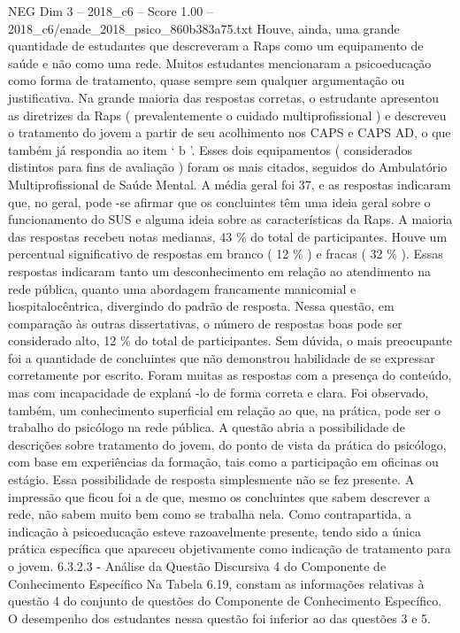 \begin{textsample}{NEG Dim 3 – 2018\_c6 – Score 1.00 – 2018\_c6/enade\_2018\_psico\_860b383a75.txt}
Houve, ainda, uma grande quantidade de estudantes que descreveram a Raps como um equipamento de saúde e não como uma rede.
Muitos estudantes mencionaram a psicoeducação como forma de tratamento, quase sempre sem qualquer argumentação ou justificativa.
Na grande maioria das respostas corretas, o estrudante apresentou as diretrizes da Raps ( prevalentemente o cuidado multiprofissional ) e descreveu o tratamento do jovem a partir de seu acolhimento nos CAPS e CAPS AD, o que também já respondia ao item ‘ b ’.
Esses dois equipamentos ( considerados distintos para fins de avaliação ) foram os mais citados, seguidos do Ambulatório Multiprofissional de Saúde Mental.
A média geral foi 37, e as respostas indicaram que, no geral, pode -se afirmar que os concluintes têm uma ideia geral sobre o funcionamento do SUS e alguma ideia sobre as características da Raps.
A maioria das respostas recebeu notas medianas, 43 \% do total de participantes.
Houve um percentual significativo de respostas em branco ( 12 \% ) e fracas ( 32 \% ).
Essas respostas indicaram tanto um desconhecimento em relação ao atendimento na rede pública, quanto uma abordagem francamente manicomial e hospitalocêntrica, divergindo do padrão de resposta.
Nessa questão, em comparação às outras dissertativas, o número de respostas boas pode ser considerado alto, 12 \% do total de participantes.
Sem dúvida, o mais preocupante foi a quantidade de concluintes que não demonstrou habilidade de se expressar corretamente por escrito.
Foram muitas as respostas com a presença do conteúdo, mas com incapacidade de explaná -lo de forma correta e clara.
Foi observado, também, um conhecimento superficial em relação ao que, na prática, pode ser o trabalho do psicólogo na rede pública.
A questão abria a possibilidade de descrições sobre tratamento do jovem, do ponto de vista da prática do psicólogo, com base em experiências da formação, tais como a participação em oficinas ou estágio.
Essa possibilidade de resposta simplesmente não se fez presente.
A impressão que ficou foi a de que, mesmo os concluintes que sabem descrever a rede, não sabem muito bem como se trabalha nela.
Como contrapartida, a indicação à psicoeducação esteve razoavelmente presente, tendo sido a única prática específica que apareceu objetivamente como indicação de tratamento para o jovem. 6.3.2.3 - Análise da Questão Discursiva 4 do Componente de Conhecimento Específico Na Tabela 6.19, constam as informações relativas à questão 4 do conjunto de questões do Componente de Conhecimento Específico.
O desempenho dos estudantes nessa questão foi inferior ao das questões 3 e 5.

\end{textsample}
